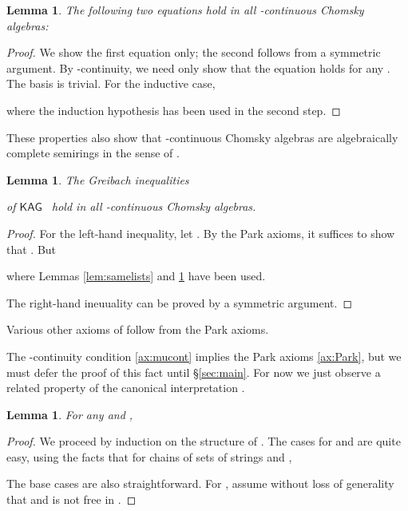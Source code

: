 \documentclass[copyright,creativecommons]{eptcs}
\newtheorem{lemma}[theorem]{Lemma}
\theoremstyle{remark}
\newcommand\mathname[1]{\ensuremath{\mathsf{#1}}}
\newcommand\KAG{\mathname{KAG}}
\newcommand{\fhcomment}[1]{\textcolor{red}{[\textbf{Comment (FH)}: {#1}]}}
\newcommand{\dkcomment}[1]{\textcolor{blue}{[\textbf{Comment (DK)}: {#1}]}}
\renewcommand{\fhcomment}[1]{}
\renewcommand{\dkcomment}[1]{}
\begin{document}
\begin{lemma}\label{lem:listdistr}
The following two equations hold in all -continuous Chomsky algebras:

\end{lemma}
\begin{proof}
We show the first equation only; the second follows from a
symmetric argument.  By -continuity, we need only show that the
equation holds for any .  The basis  is trivial.  For the inductive case,

where the induction hypothesis has been used in the second step.
\end{proof}
These properties also show that -continuous Chomsky algebras are algebraically complete semirings in the sense of \cite{esle2002,EsikLeiss05}.
\begin{lemma}
The \emph{Greibach inequalities}

of \KAG~{\upshape\cite{leiss92b}} hold in all -continuous Chomsky algebras.
\end{lemma}
\begin{proof}
For the left-hand inequality, let . By the Park axioms, it suffices to show that . But

where Lemmas \ref{lem:samelists} and \ref{lem:listdistr} have been used.

The right-hand ineuuality can be proved by a symmetric argument.
\end{proof}

Various other axioms of \cite{esle2002,EsikLeiss05,leiss92b} follow from the Park axioms.

The -continuity condition \eqref{ax:mucont} implies the Park axioms \eqref{ax:Park}, but we must defer the proof of this fact until \S\ref{sec:main}. For now we just observe a related property of the canonical interpretation .

\begin{lemma}
\label{lem:freecont}
For any  and ,
\fhcomment{Change:  to ;  is reminiscent of ``polynomial''.}\dkcomment{OK}
\end{lemma}
\begin{proof}
We proceed by induction on the structure of .
The cases for  and  are quite easy, using the facts that for chains of sets of strings  and ,

The base cases are also straightforward. For , assume without loss of generality that  and  is not free in .


\end{proof}
\end{document}
